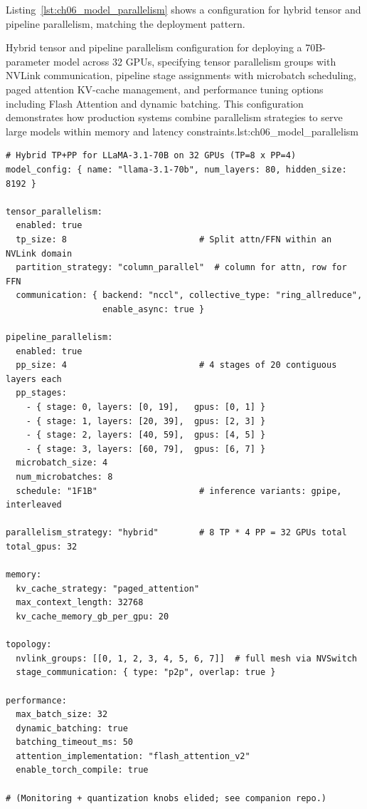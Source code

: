 Listing~\ref{lst:ch06_model_parallelism} shows a configuration for hybrid tensor and pipeline parallelism, matching the \ishtar{} deployment pattern.

\begin{codebox}{Hybrid tensor and pipeline parallelism configuration for deploying a 70B-parameter model across 32 GPUs, specifying tensor parallelism groups with NVLink communication, pipeline stage assignments with microbatch scheduling, paged attention KV-cache management, and performance tuning options including Flash Attention and dynamic batching. This configuration demonstrates how production systems combine parallelism strategies to serve large models within memory and latency constraints.}{lst:ch06_model_parallelism}
\begin{verbatim}
# Hybrid TP+PP for LLaMA-3.1-70B on 32 GPUs (TP=8 x PP=4)
model_config: { name: "llama-3.1-70b", num_layers: 80, hidden_size: 8192 }

tensor_parallelism:
  enabled: true
  tp_size: 8                          # Split attn/FFN within an NVLink domain
  partition_strategy: "column_parallel"  # column for attn, row for FFN
  communication: { backend: "nccl", collective_type: "ring_allreduce",
                   enable_async: true }

pipeline_parallelism:
  enabled: true
  pp_size: 4                          # 4 stages of 20 contiguous layers each
  pp_stages:
    - { stage: 0, layers: [0, 19],   gpus: [0, 1] }
    - { stage: 1, layers: [20, 39],  gpus: [2, 3] }
    - { stage: 2, layers: [40, 59],  gpus: [4, 5] }
    - { stage: 3, layers: [60, 79],  gpus: [6, 7] }
  microbatch_size: 4
  num_microbatches: 8
  schedule: "1F1B"                    # inference variants: gpipe, interleaved

parallelism_strategy: "hybrid"        # 8 TP * 4 PP = 32 GPUs total
total_gpus: 32

memory:
  kv_cache_strategy: "paged_attention"
  max_context_length: 32768
  kv_cache_memory_gb_per_gpu: 20

topology:
  nvlink_groups: [[0, 1, 2, 3, 4, 5, 6, 7]]  # full mesh via NVSwitch
  stage_communication: { type: "p2p", overlap: true }

performance:
  max_batch_size: 32
  dynamic_batching: true
  batching_timeout_ms: 50
  attention_implementation: "flash_attention_v2"
  enable_torch_compile: true

# (Monitoring + quantization knobs elided; see companion repo.)
\end{verbatim}
\end{codebox}

